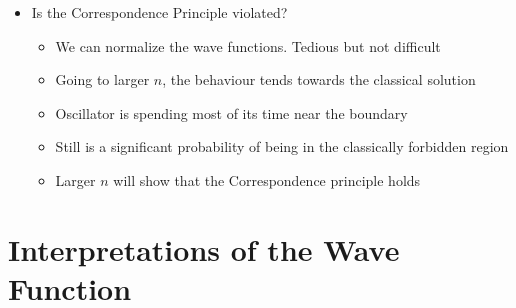 \documentclass[12pt]{article}
\begin{document}
\begin{itemize}
\begin{itemize}
    \end{itemize}
    \item Is the Correspondence Principle violated? \begin{itemize}
        \item We can normalize the wave functions. Tedious but not difficult 
        \item Going to larger $n$, the behaviour tends towards the classical solution 
        \item Oscillator is spending most of its time near the boundary 
        \item Still is a significant probability of being in the classically forbidden region 
        \item Larger $n$ will show that the Correspondence principle holds 
    \end{itemize}
\end{itemize}

\section{Interpretations of the Wave Function}
\end{document}
